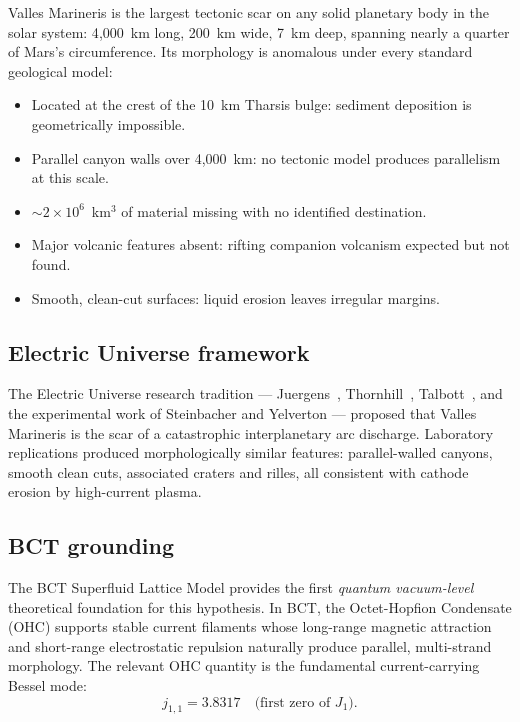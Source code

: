 \documentclass[12pt,twocolumn]{article}
\begin{document}
Valles Marineris is the largest tectonic scar on any solid planetary
body in the solar system: 4{,}000~km long, 200~km wide, 7~km deep,
spanning nearly a quarter of Mars's circumference. Its morphology
is anomalous under every standard geological model:

\begin{itemize}\setlength\itemsep{0pt}
  \item Located at the crest of the 10~km Tharsis bulge: sediment
        deposition is geometrically impossible.
  \item Parallel canyon walls over 4{,}000~km: no tectonic model
        produces parallelism at this scale.
  \item ${\sim}2\times10^6$~km$^3$ of material missing with no
        identified destination.
  \item Major volcanic features absent: rifting companion volcanism
        expected but not found.
  \item Smooth, clean-cut surfaces: liquid erosion leaves irregular
        margins.
\end{itemize}

\subsection{Electric Universe framework}

The Electric Universe research tradition --- Juergens~\cite{Juergens1974},
Thornhill~\cite{Thornhill2001}, Talbott~\cite{Talbott2015}, and
the experimental work of Steinbacher and Yelverton --- proposed
that Valles Marineris is the scar of a catastrophic interplanetary
arc discharge. Laboratory replications produced morphologically
similar features: parallel-walled canyons, smooth clean cuts,
associated craters and rilles, all consistent with cathode erosion
by high-current plasma.

\subsection{BCT grounding}

The BCT Superfluid Lattice Model provides the first
\textit{quantum vacuum-level} theoretical foundation for this
hypothesis. In BCT, the Octet-Hopfion Condensate (OHC) supports
stable current filaments whose long-range magnetic attraction and
short-range electrostatic repulsion naturally produce parallel,
multi-strand morphology. The relevant OHC quantity is the
fundamental current-carrying Bessel mode:
\begin{equation}
  j_{1,1} = 3.8317 \quad \text{(first zero of } J_1\text{)}.
\end{equation}
\end{document}
